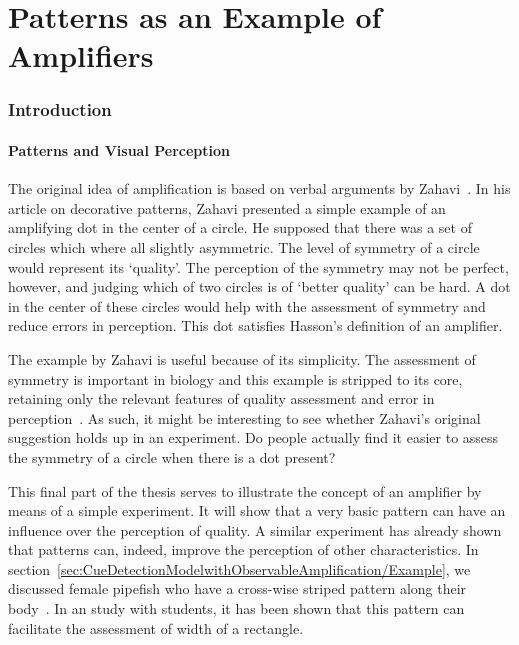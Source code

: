 \documentclass[a4paper,12pt]{article}
\numberwithin{equation}{section}
\begin{document}
\newpage\clearpage


\part{Patterns as an Example of Amplifiers}
\label{sec:Patterns as an Example of Amplifiers}

\newpage\clearpage


\section{Introduction}
\label{sec:Part 4/Introduction}
\subsection{Patterns and Visual Perception}
\label{sec:Patterns and Visual Perception}

The original idea of amplification is based on verbal arguments by Zahavi~\cite{Zahavi1978}. In his article on decorative patterns, Zahavi presented a simple example of an amplifying dot in the center of a circle. He supposed that there was a set of circles which where all slightly asymmetric. The level of symmetry of a circle would represent its `quality'. The perception of the symmetry may not be perfect, however, and judging which of two circles is of `better quality' can be hard. A dot in the center of these circles would help with the assessment of symmetry and reduce errors in perception. This dot satisfies Hasson's definition of an amplifier.

The example by Zahavi is useful because of its simplicity. The assessment of symmetry is important in biology and this example is stripped to its core, retaining only the relevant features of quality assessment and error in perception~\cite{Moller1997, Johnstone1994}. As such, it might be interesting to see whether Zahavi's original suggestion holds up in an experiment. Do people actually find it easier to assess the symmetry of a circle when there is a dot present?

This final part of the thesis serves to illustrate the concept of an amplifier by means of a simple experiment. It will show that a very basic pattern can have an influence over the perception of quality. A similar experiment has already shown that patterns can, indeed, improve the perception of other characteristics. In section~\ref{sec:CueDetectionModelwithObservableAmplification/Example}, we discussed female pipefish who have a cross-wise striped pattern along their body~\cite{Berglund2000}. In an study with students, it has been shown that this pattern can facilitate the assessment of width of a rectangle.
\end{document}
